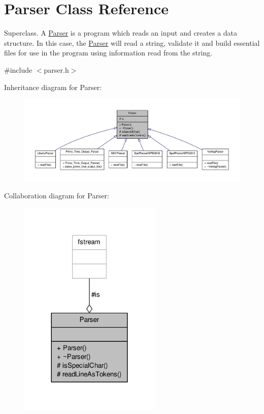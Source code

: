 \hypertarget{classParser}{\section{Parser Class Reference}
\label{classParser}
}


Superclass. A \hyperlink{classParser}{Parser} is a program which reads an input and creates a data structure. In this case, the \hyperlink{classParser}{Parser} will read a string, validate it and build essential files for use in the program using information read from the string.  




{\ttfamily \#include $<$parser.\-h$>$}



Inheritance diagram for Parser\-:\nopagebreak
\begin{figure}[H]
\begin{center}
\leavevmode
\includegraphics[width=350pt]{classParser__inherit__graph}
\end{center}
\end{figure}


Collaboration diagram for Parser\-:\nopagebreak
\begin{figure}[H]
\begin{center}
\leavevmode
\includegraphics[width=192pt]{classParser__coll__graph}
\end{center}
\end{figure}
